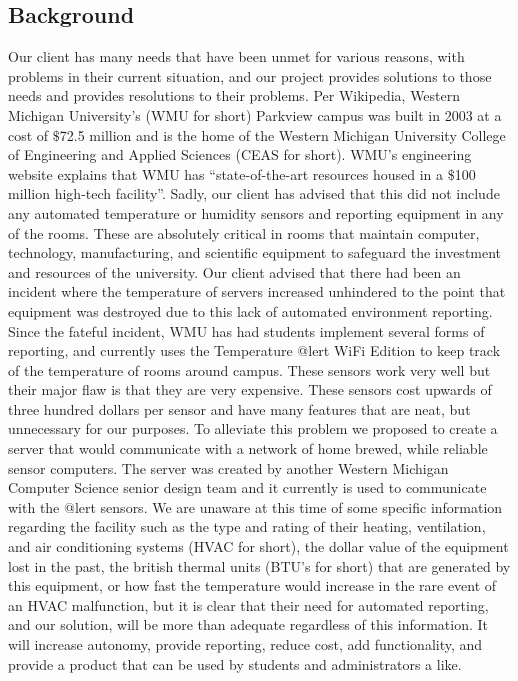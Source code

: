\documentclass{report}
\begin{document}
\subsection*{Background}
Our client has many needs that have been unmet for various reasons, with problems in their current situation, and our project provides solutions to those needs and provides resolutions to their problems.
\newline
\indent
Per Wikipedia, Western Michigan University's (WMU for short) Parkview campus was built in 2003 at a cost of $\$$72.5 million and is the home of the Western Michigan University College of Engineering and Applied Sciences (CEAS for short).  WMU’s engineering website explains that WMU has “state-of-the-art resources housed in a $\$$100 million high-tech facility”. 
Sadly, our client has advised that this did not include any automated temperature or humidity sensors and reporting equipment in any of the rooms.  These are absolutely critical in rooms that maintain computer, technology, manufacturing, and scientific equipment to safeguard the investment and resources of the university. Our client advised that there had been an incident where the temperature of servers increased unhindered to the point that equipment was destroyed due to this lack of automated environment reporting.
Since the fateful incident, WMU has had students implement several forms of reporting, and currently uses the Temperature @lert WiFi Edition to keep track of the temperature of rooms around campus. These sensors work very well but their major flaw is that they are very expensive. These sensors cost upwards of three hundred dollars per sensor and have many features that are neat, but unnecessary for our purposes. 
To alleviate this problem we proposed to create a server that would communicate with a network of home brewed, while reliable sensor computers. The server was created by another Western Michigan Computer Science senior design team and it currently is used to communicate with the @lert sensors.
\newline
\indent  
	We are unaware at this time of some specific information regarding the facility such as the type and rating of their heating, ventilation, and air conditioning systems (HVAC for short), the dollar value of the equipment lost in the past, the british thermal units (BTU’s for short) that are generated by this equipment, or how fast the temperature would increase in the rare event of an HVAC malfunction, but it is clear that their need for automated reporting, and our solution, will be more than adequate regardless of this information.  It will increase autonomy, provide reporting, reduce cost, add functionality, and provide a product that can be used by students and administrators a like.
\end{document}

